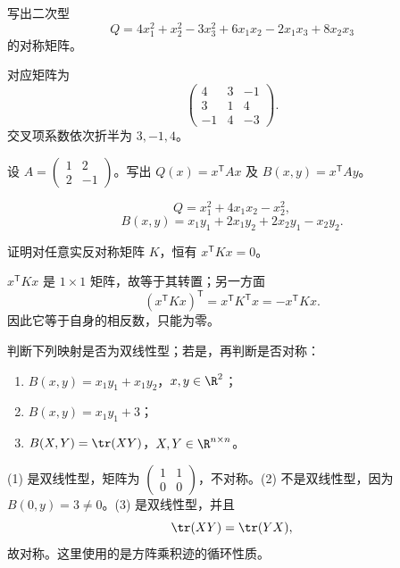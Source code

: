 %
%

\begin{exercise}[level=basic]
写出二次型
\[
Q=4x_1^2+x_2^2-3x_3^2+6x_1x_2-2x_1x_3+8x_2x_3
\]
的对称矩阵。
\begin{solution}
对应矩阵为
\[
\begin{pmatrix}4&3&-1\\3&1&4\\-1&4&-3\end{pmatrix}.
\]
交叉项系数依次折半为 $3,-1,4$。
\end{solution}
\end{exercise}

\begin{exercise}[level=basic]
设 $A=\begin{pmatrix}1&2\\2&-1\end{pmatrix}$。写出 $Q(x)=x^{\mathsf T}Ax$ 及 $B(x,y)=x^{\mathsf T}Ay$。
\begin{solution}
\[
Q=x_1^2+4x_1x_2-x_2^2,
\]
\[
B(x,y)=x_1y_1+2x_1y_2+2x_2y_1-x_2y_2.
\]
\end{solution}
\end{exercise}

\begin{exercise}[level=basic]
证明对任意实反对称矩阵 $K$，恒有 $x^{\mathsf T}Kx=0$。
\begin{solution}
$x^{\mathsf T}Kx$ 是 $1\times1$ 矩阵，故等于其转置；另一方面
\[
(x^{\mathsf T}Kx)^{\mathsf T}=x^{\mathsf T}K^{\mathsf T}x=-x^{\mathsf T}Kx.
\]
因此它等于自身的相反数，只能为零。
\end{solution}
\end{exercise}

\begin{exercise}[level=basic]
判断下列映射是否为双线性型；若是，再判断是否对称：
\begin{enumerate}[label=(\arabic*)]
\item $B(x,y)=x_1y_1+x_1y_2$，$x,y\in\R^2$；
\item $B(x,y)=x_1y_1+3$；
\item $B(X,Y)=\tr(XY)$，$X,Y\in\R^{n\times n}$。
\end{enumerate}
\begin{solution}
(1) 是双线性型，矩阵为 $\begin{pmatrix}1&1\\0&0\end{pmatrix}$，不对称。(2) 不是双线性型，因为 $B(0,y)=3\ne0$。(3) 是双线性型，并且
\[
\tr(XY)=\tr(YX),
\]
故对称。这里使用的是方阵乘积迹的循环性质。
\end{solution}
\end{exercise}

